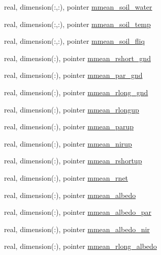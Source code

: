 \begin{DoxyCompactItemize}
\item 
real, dimension(\+:,\+:), pointer \hyperlink{structed__state__vars_1_1edtype_a50e8296ccd2049c2d9bfdd7bb98675c4}{mmean\+\_\+soil\+\_\+water}
\item 
real, dimension(\+:,\+:), pointer \hyperlink{structed__state__vars_1_1edtype_a1961bdf035254c3258c831b79da961af}{mmean\+\_\+soil\+\_\+temp}
\item 
real, dimension(\+:,\+:), pointer \hyperlink{structed__state__vars_1_1edtype_a0842934b184941631f707f903c6398e7}{mmean\+\_\+soil\+\_\+fliq}
\item 
real, dimension(\+:), pointer \hyperlink{structed__state__vars_1_1edtype_aff5e202b683fa4f2e53bec9ca5aff164}{mmean\+\_\+rshort\+\_\+gnd}
\item 
real, dimension(\+:), pointer \hyperlink{structed__state__vars_1_1edtype_a4ae072a1608f554185d9bce99ce25db1}{mmean\+\_\+par\+\_\+gnd}
\item 
real, dimension(\+:), pointer \hyperlink{structed__state__vars_1_1edtype_a27d03b4bd0f21f9b31274b3c7f4a3e15}{mmean\+\_\+rlong\+\_\+gnd}
\item 
real, dimension(\+:), pointer \hyperlink{structed__state__vars_1_1edtype_a2e2f025cfe2181380ccc476757d9904a}{mmean\+\_\+rlongup}
\item 
real, dimension(\+:), pointer \hyperlink{structed__state__vars_1_1edtype_a14d68795503e20690062bd42968a7ad5}{mmean\+\_\+parup}
\item 
real, dimension(\+:), pointer \hyperlink{structed__state__vars_1_1edtype_af2b79510251baddee94c5c1ba24a2388}{mmean\+\_\+nirup}
\item 
real, dimension(\+:), pointer \hyperlink{structed__state__vars_1_1edtype_a84386b9be87dd6f10fdd7c85e5e3e9ad}{mmean\+\_\+rshortup}
\item 
real, dimension(\+:), pointer \hyperlink{structed__state__vars_1_1edtype_a4454f05eed37bb64f9da81db402b532e}{mmean\+\_\+rnet}
\item 
real, dimension(\+:), pointer \hyperlink{structed__state__vars_1_1edtype_aa93f6267ee472b4132751901e52f9703}{mmean\+\_\+albedo}
\item 
real, dimension(\+:), pointer \hyperlink{structed__state__vars_1_1edtype_aa7254e6920480f6d10174eecb5219862}{mmean\+\_\+albedo\+\_\+par}
\item 
real, dimension(\+:), pointer \hyperlink{structed__state__vars_1_1edtype_a86b887aac70f5527f29dfbfa18c32c1d}{mmean\+\_\+albedo\+\_\+nir}
\item 
real, dimension(\+:), pointer \hyperlink{structed__state__vars_1_1edtype_a7654ce31570a6f19731be3f7085da944}{mmean\+\_\+rlong\+\_\+albedo}

\end{DoxyCompactItemize}
